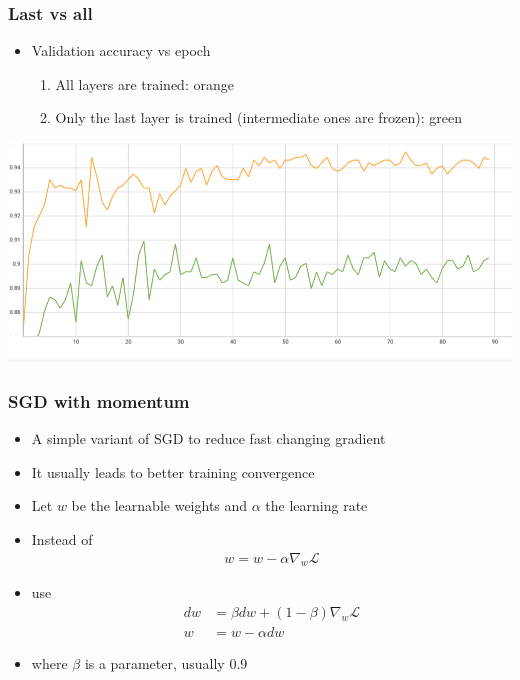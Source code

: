 \documentclass{beamer}
\begin{document}
\begin{frame}
    \frametitle{Last vs all}
\begin{itemize}
    \item Validation accuracy vs epoch
    \begin{enumerate}
        \item All layers are trained: orange
        \item Only the last layer is trained (intermediate ones are frozen): green
    \end{enumerate}
\end{itemize}
    \includegraphics[width=\textwidth]{figs/last-vs-all.png}

\end{frame}

\begin{frame}
    \frametitle{SGD with momentum}

    \begin{itemize}
        \item A simple variant of SGD to reduce fast changing gradient
        \item It usually leads to better training convergence
        \item Let $w$ be the learnable weights and $\alpha$ the learning rate
        \item Instead of 
        \begin{align*}
            w=w-\alpha \nabla_w\mathcal{L}
        \end{align*}
\item use         
\begin{align*}
    dw&=\beta dw+(1-\beta)\nabla_w\mathcal{L}\\
    w&=w-\alpha dw
\end{align*}
\item where $\beta$ is a parameter, usually 0.9
    \end{itemize}
\end{frame}
\end{document}

